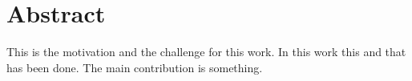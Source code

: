 

{ 

\chapter*{Abstract}

\vspace*{-1cm}


This is the motivation and the challenge for this work.
In this work this and that has been done.
The main contribution is something.

}

